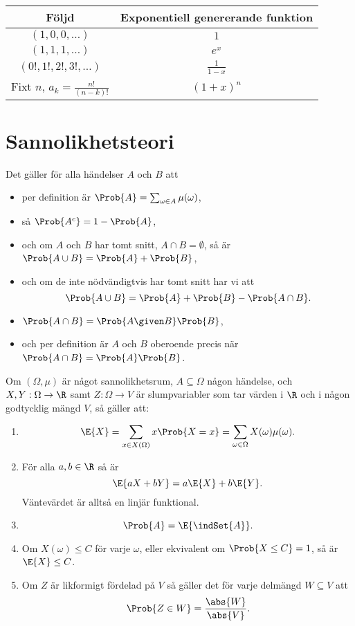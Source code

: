 \documentclass[nobib]{tufte-handout}
\begin{document}
\begin{tabularx}{0.9\linewidth}{cc}
  Följd & Exponentiell genererande funktion\\
  \midrule
  $(1, 0, 0, \ldots)$ & $1$\\
  $(1, 1, 1, \ldots)$ & $e^x$\\
  $(0!, 1!, 2!, 3!, \ldots)$ & $\frac{1}{1-x}$\\
  Fixt $n$, $a_k = \frac{n!}{(n-k)!}$ & $(1 + x)^n$
\end{tabularx}

\section{Sannolikhetsteori}

\begin{lemma}
  Det gäller för alla händelser $A$ och $B$ att
  \begin{itemize}
      \item per definition är $\Prob{A} = \sum_{\omega \in A} \mu(\omega)$,
      \item så $\Prob{A^c} = 1 - \Prob{A}$,
      \item och om $A$ och $B$ har tomt snitt, $A\cap B = \emptyset$, så är $\Prob{A \cup B} = \Prob{A} + \Prob{B}$,
      \item och om de inte nödvändigtvis har tomt snitt har vi att
      $$\Prob{A \cup B} = \Prob{A} + \Prob{B} - \Prob{A \cap B}.$$
      \item $\Prob{A \cap B} = \Prob{A \given B}\Prob{B}$,
      \item och per definition är $A$ och $B$ oberoende precis när $\Prob{A \cap B} = \Prob{A}\Prob{B}$.
  \end{itemize}
\end{lemma}

\begin{lemma}
  Om $(\Omega, \mu)$ är något sannolikhetsrum, $A \subseteq \Omega$ någon händelse, och $X, Y: \Omega \to \R$ samt $Z: \Omega \to V$ är slumpvariabler som tar värden i $\R$ och i någon godtycklig mängd $V$, så gäller att:
  \begin{enumerate}
      \item $$\E{X} = \sum_{x \in X(\Omega)} x \Prob{X = x} = \sum_{\omega \in \Omega} X(\omega)\mu(\omega).$$
      \item För alla $a, b \in \R$ så är
      $$\E{aX + bY} = a\E{X} + b\E{Y}.$$
      Väntevärdet är alltså en linjär funktional.
      \item $$\Prob{A} = \E{\indSet{A}}.$$
      \item Om $X(\omega) \leq C$ för varje $\omega$, eller ekvivalent om $\Prob{X \leq C} = 1$, så är $\E{X} \leq C$.
      \item Om $Z$ är likformigt fördelad på $V$ så gäller det för varje delmängd $W \subseteq V$ att
      $$\Prob{Z \in W} = \frac{\abs{W}}{\abs{V}}.$$
  \end{enumerate}
\end{lemma}

%
%
\end{document}

